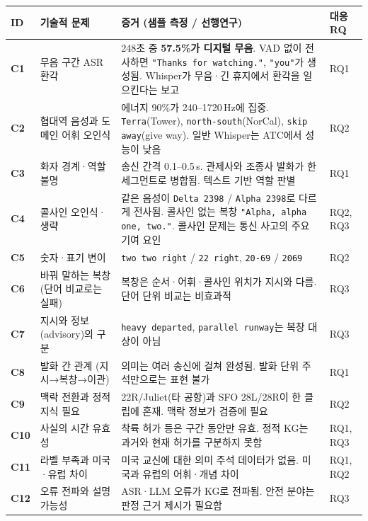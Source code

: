 \documentclass[10pt,a4paper]{article}
\newcommand{\ch}[1]{\textbf{\textcolor{red!60!black}{#1}}}
\begin{document}
\begin{center}\small
\begin{tabularx}{\textwidth}{@{}l>{\raggedright\arraybackslash}p{3.6cm}>{\raggedright\arraybackslash}X l@{}}
\toprule
ID & 기술적 문제 & 증거 (샘플 측정 / 선행연구) & 대응 RQ\\\midrule
\ch{C1} & 무음 구간 ASR 환각 & 248초 중 \textbf{57.5\%가 디지털 무음}. VAD 없이 전사하면 \texttt{"Thanks for watching."}, \texttt{"you"}가 생성됨. Whisper가 무음·긴 휴지에서 환각을 일으킨다는 보고 \cite{koenecke2024} & RQ1\\
\ch{C2} & 협대역 음성과 도메인 어휘 오인식 & 에너지 90\%가 240--1720\,Hz에 집중. \texttt{Terra}(Tower), \texttt{north-south}(NorCal), \texttt{skip away}(give way). 일반 Whisper는 ATC에서 성능이 낮음 \cite{atco2,vandoorn} & RQ2\\
\ch{C3} & 화자 경계·역할 불명 & 송신 간격 0.1--0.5\,s. 관제사와 조종사 발화가 한 세그먼트로 병합됨. 텍스트 기반 역할 판별 \cite{bertraffic} & RQ1\\
\ch{C4} & 콜사인 오인식·생략 & 같은 음성이 \texttt{Delta 2398} / \texttt{Alpha 2398}로 다르게 전사됨. 콜사인 없는 복창 \texttt{"Alpha, alpha one, two."}. 콜사인 문제는 통신 사고의 주요 기여 요인 \cite{eurocontrol,cardosi94} & RQ2, RQ3\\
\ch{C5} & 숫자·표기 변이 & \texttt{two two right} / \texttt{22 right}, \texttt{20-69} / \texttt{2069} & RQ2\\
\ch{C6} & 바꿔 말하는 복창 (단어 비교로는 실패) & 복창은 순서·어휘·콜사인 위치가 지시와 다름. 단어 단위 비교는 비효과적 \cite{helmke2021} & RQ3\\
\ch{C7} & 지시와 정보(advisory)의 구분 & \texttt{heavy departed}, \texttt{parallel runway}는 복창 대상이 아님 & RQ3\\
\ch{C8} & 발화 간 관계 (지시→복창→이관) & 의미는 여러 송신에 걸쳐 완성됨. 발화 단위 주석만으로는 표현 불가 \cite{kleinert2021,helmke2018} & RQ1\\
\ch{C9} & 맥락 전환과 정적 지식 필요 & 22R/Juliet(타 공항)과 SFO 28L/28R이 한 클립에 혼재. 맥락 정보가 검증에 필요 \cite{helmke2021,nigmatulina2022} & RQ2\\
\ch{C10} & 사실의 시간 유효성 & 착륙 허가 등은 구간 동안만 유효. 정적 KG는 과거와 현재 허가를 구분하지 못함 \cite{cai2024tkg,knez2023} & RQ1, RQ3\\
\ch{C11} & 라벨 부족과 미국·유럽 차이 & 미국 교신에 대한 의미 주석 데이터가 없음. 미국과 유럽의 어휘·개념 차이 \cite{chen2023} & RQ1, RQ2\\
\ch{C12} & 오류 전파와 설명 가능성 & ASR·LLM 오류가 KG로 전파됨. 안전 분야는 판정 근거 제시가 필요함 \cite{pan2024} & RQ3\\

\end{tabularx}
\end{center}
\end{document}
